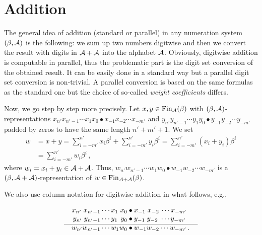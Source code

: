 \section{Addition}
\label{sec:addition}
The general idea of addition (standard or parallel) in any numeration system $(\beta,\mathcal{A})$ is the following: we sum up two numbers digitwise and then we convert the result with digits in $\mathcal{A}+\mathcal{A}$ into the alphabet $\mathcal{A}$. Obviously, digitwise addition is computable in parallel, thus the problematic part is the digit set conversion of the obtained result. It can be easily done in a standard way but a parallel digit set conversion is non-trivial. A parallel conversion is based on the same  formulas as the standard one but the choice of so-called \emph{weight coefficients} differs.

Now, we go step by step more precisely. Let $x,y \in \text{Fin}_{\mathcal{A}}(\beta)$ with $(\beta,\mathcal{A})$-representa\-tions $x_{n'}x_{{n'}-1}\cdots x_1 x_0\bullet x_{-1} x_{-2} \cdots x_{-m'}$ and $y_{n'}y_{{n'}-1}\cdots y_1 y_0\bullet y_{-1} y_{-2} \cdots y_{-m'}$ padded by zeros to have the same length $n'+m'+1$. We set 
  \begin{align*}
    w&=x+y =\sum_{i=-m'}^{n'} x_i\beta^i + \sum_{i=-m'}^{n'} y_i\beta^i = \sum_{i=-m'}^{n'} (x_i+y_i)\beta^i \\
    &=\sum_{i=-m'}^{n'} w_i\beta^i \,,
  \end{align*}
  where $w_i=x_i+y_i \in \mathcal{A} +\mathcal{A}$. Thus, $w_{n'} w_{{n'}-1}\cdots w_1 w_0 \bullet w_{-1} w_{-2} \cdots w_{-m'}$ is a  $(\beta, \mathcal{A}+\mathcal{A})$-representation of $w\in \text{Fin}_{\mathcal{A}+\mathcal{A}}(\beta)$. 

We also use column notation for digitwise addition in what follows, e.g.,    
 
  \begin{align*}
  x_{n'} \;x_{{n'}-1}\cdots x_1 \;x_0 &\bullet x_{-1} \;x_{-2}\, \cdots x_{-m'} \\[-3pt]
  y_{n'} \;y_{{n'}-1}\cdots y_1 \,\;y_0 &\bullet y_{-1} \;y_{-2} \;\cdots y_{-m'} \\[-10pt]
    \line(1,0){90} & \line(1,0){100} \\[-7pt]
  w_{n'} w_{{n'}-1}\cdots w_1 w_0 &\bullet w_{-1} w_{-2} \cdots w_{-m'}\,.
  \end{align*}
  
